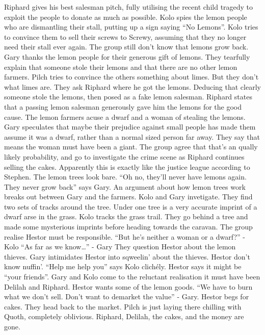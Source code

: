 Riphard gives his best salesman pitch, fully utilising the recent child tragedy to exploit the people to donate as much as possible. Kolo spies the lemon people who are dismantling their stall, putting up a sign saying “No Lemons”. Kolo tries to convince them to sell their screws to Screwy, assuming that they no longer need their stall ever again.\medskip
The group still don’t know that lemons grow back.\medskip
Gary thanks the lemon people for their generous gift of lemons. They tearfully explain that someone stole their lemons and that there are no other lemon farmers.\medskip
Pilch tries to convince the others something about limes. But they don’t what limes are.\medskip
They ask Riphard where he got the lemons. Deducing that clearly someone stole the lemons, then posed as a fake lemon salesman. Riphard states that a passing lemon salesman generously gave him the lemons for the good cause.\medskip
The lemon farmers acuse a dwarf and a woman of stealing the lemons. Gary speculates that maybe their prejudice against small people has made them assume it was a dwarf, rather than a normal sized person far away. They say that means the woman must have been a giant. The group agree that that’s an qually likely probability, and go to investigate the crime scene as Riphard continues selling the cakes.\medskip
Apparently this is exactly like the justice league according to Stephen.\medskip
The lemon trees look bare.\medskip
“Oh no, they’ll never have lemons again. They never grow back” says Gary.\medskip
An argument about how lemon trees work breaks out between Gary and the farmers.\medskip
Kolo and Gary invetigate. They find two sets of tracks around the tree. Under one tree is a very accurate imprint of a dwarf arse in the grass. Kolo tracks the grass trail. They go behind a tree and made some mysterious imprints before heading towards the caravan. The group realise Hestor must be responsible.\medskip
“But he’s neither a woman or a dwarf?” - Kolo\medskip
“As far as we know…” - Gary\medskip
They question Hestor about the lemon thieves. Gary intimidates Hestor into sqweelin’ about the thieves. Hestor don’t know nuffin’.\medskip
“Help me help you” says Kolo clichély.\medskip
Hestor says it might be “your friends”. Gary and Kolo come to the reluctant realisation it must have been Delilah and Riphard.\medskip
Hestor wants some of the lemon goods.\medskip
“We have to burn what we don’t sell. Don’t want to demarket the value” - Gary.\medskip
Hestor begs for cakes. They head back to the market. Pilch is just laying there chilling with Quoth, completely oblivious. Riphard, Delilah, the cakes, and the money are gone.\medskip
